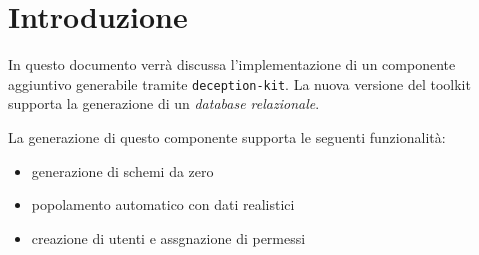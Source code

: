 \section{Introduzione}

In questo documento verrà discussa l'implementazione di un componente aggiuntivo generabile tramite \texttt{deception-kit}. La nuova versione del toolkit supporta la generazione di un \textit{database relazionale}.

La generazione di questo componente supporta le seguenti funzionalità:
\begin{itemize}
    \item generazione di schemi da zero
    \item popolamento automatico con dati realistici
    \item creazione di utenti e assgnazione di permessi
\end{itemize}


